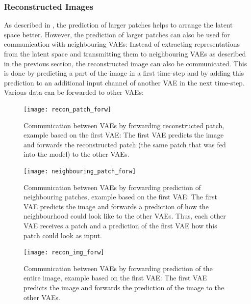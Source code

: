 \subsubsection{Reconstructed Images}
As described in , the prediction of larger patches helps to arrange the latent space better. However, the prediction of larger patches can also be used for communication with neighbouring VAEs: Instead of extracting representations from the latent space and transmitting them to neighbouring VAEs as described in the previous section, the reconstructed image can also be communicated. This is done by predicting a part of the image in a first time-step and by adding this prediction to an additional input channel of another VAE in the next time-step. Various data can be forwarded to other VAEs:


\begin{figure}
    \centering
    \texttt{[image: recon\_patch\_forw]}
    \caption[Communication between VAEs by forwarding reconstructed patch]{Communication between VAEs by forwarding reconstructed patch, example based on the first VAE: The first VAE predicts the image and forwards the reconstructed patch (the same patch that was fed into the model) to the other VAEs.}
\end{figure}

\begin{figure}
    \centering
    \texttt{[image: neighbouring\_patch\_forw]}
    \caption[Communication between VAEs by forwarding prediction of neighbouring patches]{Communication between VAEs by forwarding prediction of neighbouring patches, example based on the first VAE: The first VAE predicts the image and forwards a prediction of how the neighbourhood could look like to the other VAEs. Thus, each other VAE receives a patch and a prediction of the first VAE how this patch could look as input.}
\end{figure}

\begin{figure}
    \centering
    \texttt{[image: recon\_img\_forw]}
    \caption[Communication between VAEs by forwarding prediction of the entire image]{Communication between VAEs by forwarding prediction of the entire image, example based on the first VAE: The first VAE predicts the image and forwards the prediction of the image to the other VAEs.}
\end{figure}



